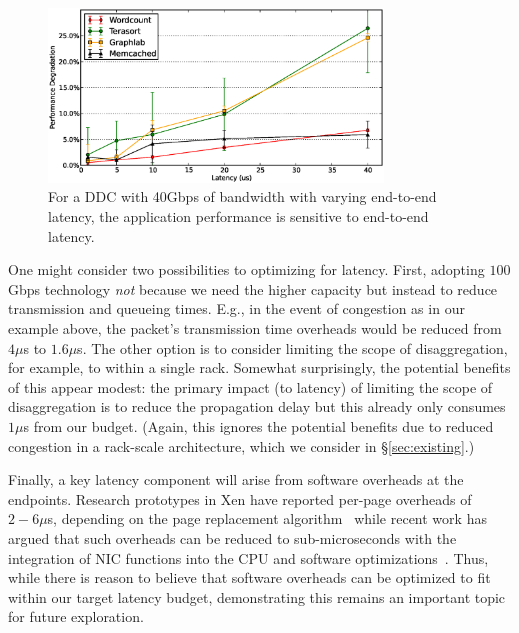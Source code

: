%
\begin{figure}
  \centering
    \includegraphics[width = 3.5in]{img/fix_bw_vary_latency.eps} 
  \caption{\small{For a DDC with 40Gbps of bandwidth with varying end-to-end latency, the application performance is sensitive to end-to-end latency.}}
  \label{fig:impl}
\end{figure}
%

One might consider two possibilities to optimizing for latency. First, adopting $100$Gbps technology \emph{not} because we need the higher capacity but instead to reduce transmission and queueing times. E.g., in the event of congestion as in our example above, the packet's transmission time overheads would be reduced from $4\mu$s to $1.6\mu$s. 
The other option is to consider limiting the scope of disaggregation, for example, to within a single rack. Somewhat surprisingly, the potential benefits of this appear modest: the primary impact (to latency) of limiting the scope of disaggregation is to reduce the propagation delay but this already only consumes $1\mu$s from our budget.
(Again, this ignores the potential benefits due to reduced congestion in a rack-scale architecture, which we consider in \S\ref{sec:existing}.)

Finally, a key latency component will arise from software overheads 
at the endpoints. Research prototypes in Xen have reported per-page overheads of $2-6\mu$s, depending on the page replacement algorithm~\cite{ddcHwDesign1} while recent work has argued that such overheads can be reduced to sub-microseconds with the integration of NIC functions into the CPU and software optimizations~\cite{lowlatency}. Thus, while there is reason to believe that software overheads can be optimized to fit within our target latency budget, demonstrating this remains an important topic for future exploration.

